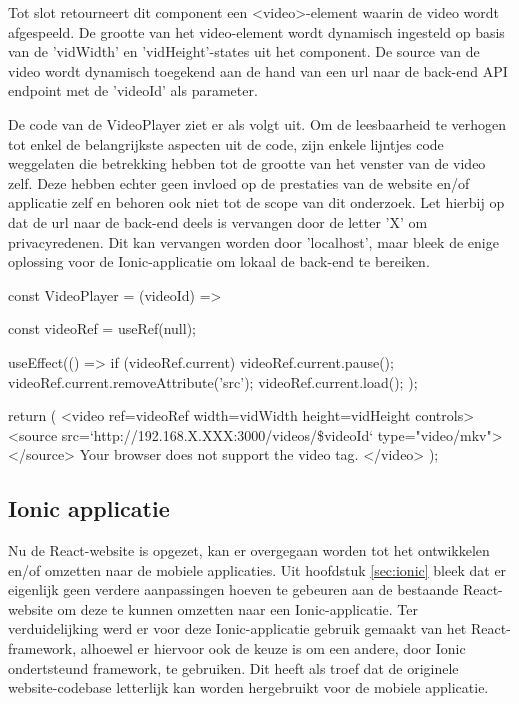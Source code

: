 Tot slot retourneert dit component een <video>-element waarin de video wordt afgespeeld. De grootte van het video-element wordt dynamisch ingesteld op basis van de 'vidWidth' en 'vidHeight'-states uit het component. De source van de video wordt dynamisch toegekend aan de hand van een url naar de back-end API endpoint met de 'videoId' als parameter.

De code van de VideoPlayer ziet er als volgt uit. Om de leesbaarheid te verhogen tot enkel de belangrijkste aspecten uit de code, zijn enkele lijntjes code weggelaten die betrekking hebben tot de grootte van het venster van de video zelf. Deze hebben echter geen invloed op de prestaties van de website en/of applicatie zelf en behoren ook niet tot de scope van dit onderzoek. Let hierbij op dat de url naar de back-end deels is vervangen door de letter 'X' om privacyredenen. Dit kan vervangen worden door 'localhost', maar bleek de enige oplossing voor de Ionic-applicatie om lokaal de back-end te bereiken.

\begin{LVerbatim}[language=JavaScript, caption=Express API-endpoint voor het streamen van videobestanden]
const VideoPlayer = ({videoId}) => {
  const videoRef = useRef(null);

  useEffect(() => {
    if (videoRef.current) {
      videoRef.current.pause();
      videoRef.current.removeAttribute('src');
      videoRef.current.load();
    }
  });

  return (
    <video ref={videoRef} width={vidWidth} height={vidHeight} controls>
      <source src={`http://192.168.X.XXX:3000/videos/\${videoId}`}
        type="video/mkv"></source>
      Your browser does not support the video tag.
    </video>
  );
}
\end{LVerbatim}


\subsection{Ionic applicatie}
\label{sec:ionic-applicatie}

Nu de React-website is opgezet, kan er overgegaan worden tot het ontwikkelen en/of omzetten naar de mobiele applicaties. Uit hoofdstuk \ref{sec:ionic} bleek dat er eigenlijk geen verdere aanpassingen hoeven te gebeuren aan de bestaande React-website om deze te kunnen omzetten naar een Ionic-applicatie. Ter verduidelijking werd er voor deze Ionic-applicatie gebruik gemaakt van het React-framework, alhoewel er hiervoor ook de keuze is om een andere, door Ionic ondertsteund framework, te gebruiken. Dit heeft als troef dat de originele website-codebase letterlijk kan worden hergebruikt voor de mobiele applicatie.

